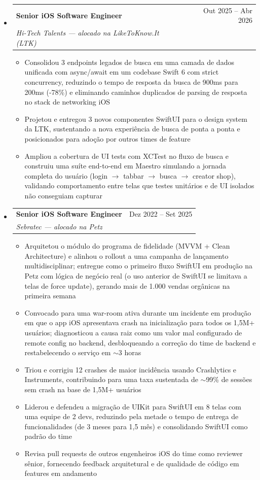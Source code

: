 \documentclass[11pt,letterpaper]{article}
\makeatletter
\newcommand{\resumeSubheading}[4]{
  \item
    \begin{tabular*}{\linewidth}{l@{\extracolsep{\fill}}r}
      \textbf{#1} & #2 \\
      \textit{#3} & \textit{#4} \\
    \end{tabular*}
}
\newcommand{\resumeItem}[1]{
  \item{#1}
}
\makeatother
\begin{document}
\begin{itemize}[leftmargin=0.15in]
    \resumeSubheading
        {Senior iOS Software Engineer}{Out 2025 -- Abr 2026}
        {Hi-Tech Talents --- alocado na LikeToKnow.It (LTK)}{}
        \begin{itemize}
            \resumeItem{Consolidou 3 endpoints legados de busca em uma camada de dados unificada com async/await em um codebase Swift 6 com strict concurrency, reduzindo o tempo de resposta da busca de 900ms para 200ms (-78\%) e eliminando caminhos duplicados de parsing de resposta no stack de networking iOS}
            \resumeItem{Projetou e entregou 3 novos componentes SwiftUI para o design system da LTK, sustentando a nova experiência de busca de ponta a ponta e posicionados para adoção por outros times de feature}
            \resumeItem{Ampliou a cobertura de UI tests com XCTest no fluxo de busca e construiu uma suíte end-to-end em Maestro simulando a jornada completa do usuário (login $\rightarrow$ tabbar $\rightarrow$ busca $\rightarrow$ creator shop), validando comportamento entre telas que testes unitários e de UI isolados não conseguiam capturar}
        \end{itemize}

    \resumeSubheading
        {Senior iOS Software Engineer}{Dez 2022 -- Set 2025}
        {Sebratec --- alocado na Petz}{}
        \begin{itemize}
            \resumeItem{Arquitetou o módulo do programa de fidelidade (MVVM + Clean Architecture) e alinhou o rollout a uma campanha de lançamento multidisciplinar; entregue como o primeiro fluxo SwiftUI em produção na Petz com lógica de negócio real (o uso anterior de SwiftUI se limitava a telas de force update), gerando mais de 1.000 vendas orgânicas na primeira semana}
            \resumeItem{Convocado para uma war-room ativa durante um incidente em produção em que o app iOS apresentava crash na inicialização para todos os 1,5M+ usuários; diagnosticou a causa raiz como um valor mal configurado de remote config no backend, desbloqueando a correção do time de backend e restabelecendo o serviço em $\sim$3 horas}
            \resumeItem{Triou e corrigiu 12 crashes de maior incidência usando Crashlytics e Instruments, contribuindo para uma taxa sustentada de $\sim$99\% de sessões sem crash na base de 1,5M+ usuários}
            \resumeItem{Liderou e defendeu a migração de UIKit para SwiftUI em 8 telas com uma equipe de 2 devs, reduzindo pela metade o tempo de entrega de funcionalidades (de 3 meses para 1,5 mês) e consolidando SwiftUI como padrão do time}
            \resumeItem{Revisa pull requests de outros engenheiros iOS do time como reviewer sênior, fornecendo feedback arquitetural e de qualidade de código em features em andamento}
        \end{itemize}


\end{itemize}
\end{document}
